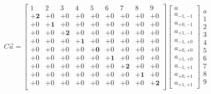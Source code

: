 \documentclass{article}
\newcommand{\0}{\mathbf{0}}
\newcommand{\1}{\mathbf{1}}
\newcommand{\2}{\mathbf{2}}
\newcommand{\3}{\mathbf{3}}
\newcommand{\4}{\mathbf{4}}
\newcommand{\5}{\mathbf{5}}
\newcommand{\6}{\mathbf{6}}
\newcommand{\7}{\mathbf{7}}
\newcommand{\8}{\mathbf{8}}
\begin{document}
\begin{small}
\setlength\arraycolsep{1.3pt}  
\begin{align*}  
  C\vec{a}=  
  \left[
   \begin{array}{rrrrrrrrr}  
     1& 2& 3& 4& 5& 6& 7& 8& 9\\    %
    +\2&+0&+0&+0&+0&+0&+0&+0&+0\\    %
    +0&+\1&+0&+0&+0&+0&+0&+0&+0\\    %
    +0&+0&+\2&+0&+0&+0&+0&+0&+0\\    %
    +0&+0&+0&+\1&+0&+0&+0&+0&+0\\    %
    +0&+0&+0&+0&+\0&+0&+0&+0&+0\\    %
    +0&+0&+0&+0&+0&+\1&+0&+0&+0\\    %
    +0&+0&+0&+0&+0&+0&+\2&+0&+0\\    %
    +0&+0&+0&+0&+0&+0&+0&+\1&+0\\    %
    +0&+0&+0&+0&+0&+0&+0&+0&+\2\\    %
   \end{array}
  \right]
  \left[
  \begin{array}{c}  
    a\\a_{-1,-1}\\a_{+0,-1}\\a_{+1,-1}\\
       a_{-1,+0}\\a_{+0,+0}\\a_{+1,+0}\\
       a_{-1,+1}\\a_{+0,+1}\\a_{+1,+1}
  \end{array}
  \right]
  \begin{array}{c}  
    a\\1\\2\\3\\4\\5\\
    6\\7\\8\\9
  \end{array}    
\end{align*}
\end{small}  
\newpage
\end{document}
